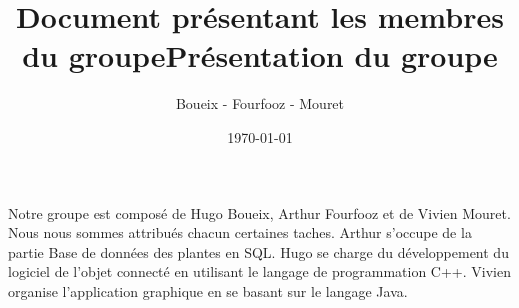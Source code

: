 \documentclass{article}
\title{Document présentant les membres du groupe}
\author{Boueix - Fourfooz - Mouret}
\date\today
\begin{document}
\title{Présentation du groupe}

	Notre groupe est composé de Hugo Boueix, Arthur Fourfooz et de Vivien Mouret.
	Nous nous sommes attribués chacun certaines taches.
	Arthur s'occupe de la partie Base de données des plantes en SQL.
	Hugo se charge du développement du logiciel de l'objet connecté en utilisant le langage de programmation C++.
	Vivien organise l'application graphique en se basant sur le langage Java.
\end{document}
